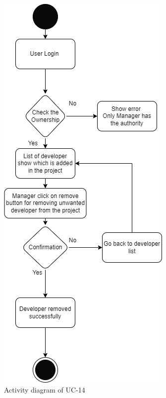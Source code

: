 \begin{figure}[H]
    \centering
    \includegraphics[scale=0.7]{./diagrams/Activity Diagram/ad-14.png}
    \caption{Activity diagram of UC-14}
    \label{fig:act-14}

\end{figure}


